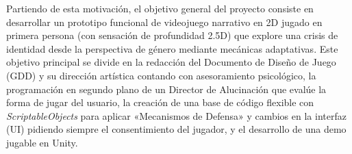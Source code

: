 Partiendo de esta motivación, el objetivo general del proyecto consiste en desarrollar un prototipo funcional de videojuego narrativo en \ac{2D} jugado en primera persona (con sensación de profundidad 2.5D) que explore una crisis de identidad desde la perspectiva de género mediante mecánicas adaptativas. Este objetivo principal se divide en la redacción del Documento de Diseño de Juego (\ac{GDD}) y su dirección artística contando con asesoramiento psicológico, la programación en segundo plano de un Director de Alucinación que evalúe la forma de jugar del usuario, la creación de una base de código flexible con \textit{ScriptableObjects} para aplicar «Mecanismos de Defensa» y cambios en la interfaz (\ac{UI}) pidiendo siempre el consentimiento del jugador, y el desarrollo de una demo jugable en Unity.